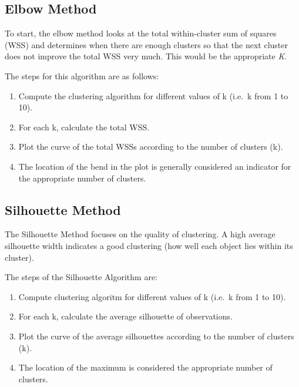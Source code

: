 \documentclass[12pt,twoside]{amherstthesis}
\providecommand{\tightlist}{%
  \setlength{\itemsep}{0pt}\setlength{\parskip}{0pt}}
\begin{document}
  \subsection{Elbow Method}\label{elbow-method}
  
  To start, the elbow method looks at the total within-cluster sum of
  squares (WSS) and determines when there are enough clusters so that the
  next cluster does not improve the total WSS very much. This would be the
  appropriate \emph{K}.
  
  The steps for this algorithm are as follows:
  
  \begin{enumerate}
  \def\labelenumi{\arabic{enumi}.}
  \tightlist
  \item
    Compute the clustering algorithm for different values of k (i.e.~k
    from 1 to 10).
  \item
    For each k, calculate the total WSS.
  \item
    Plot the curve of the total WSSs according to the number of clusters
    (k).
  \item
    The location of the bend in the plot is generally considered an
    indicator for the appropriate number of clusters.
  \end{enumerate}
  
  \subsection{Silhouette Method}\label{silhouette-method}
  
  The Silhouette Method focuses on the quality of clustering. A high
  average silhouette width indicates a good clustering (how well each
  object lies within its cluster).
  
  The steps of the Silhouette Algorithm are:
  
  \begin{enumerate}
  \def\labelenumi{\arabic{enumi}.}
  \tightlist
  \item
    Compute clustering algoritm for different values of k (i.e.~k from 1
    to 10).
  \item
    For each k, calculate the average silhouette of observations.
  \item
    Plot the curve of the average silhouettes according to the number of
    clusters (k).
  \item
    The location of the maximum is considered the appropriate number of
    clusters.
  \end{enumerate}
  
\end{document}
